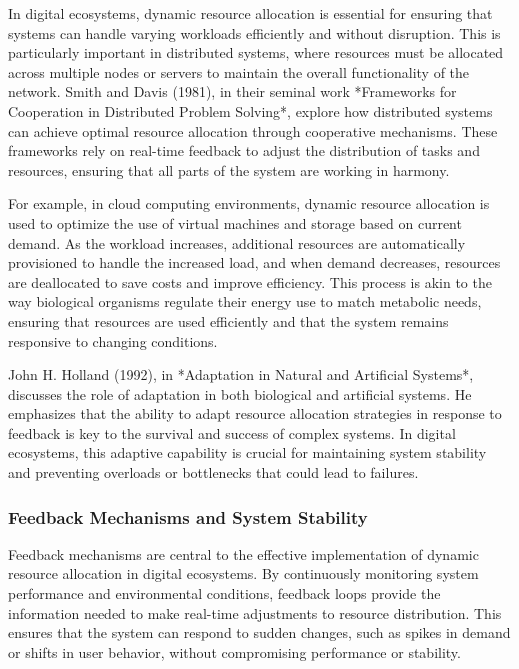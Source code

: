 \documentclass[12pt,twoside]{article}
\begin{document}
In digital ecosystems, dynamic resource allocation is essential for ensuring that systems can handle varying workloads efficiently and without disruption. This is particularly important in distributed systems, where resources must be allocated across multiple nodes or servers to maintain the overall functionality of the network. Smith and Davis (1981), in their seminal work *Frameworks for Cooperation in Distributed Problem Solving*, explore how distributed systems can achieve optimal resource allocation through cooperative mechanisms. These frameworks rely on real-time feedback to adjust the distribution of tasks and resources, ensuring that all parts of the system are working in harmony.

For example, in cloud computing environments, dynamic resource allocation is used to optimize the use of virtual machines and storage based on current demand. As the workload increases, additional resources are automatically provisioned to handle the increased load, and when demand decreases, resources are deallocated to save costs and improve efficiency. This process is akin to the way biological organisms regulate their energy use to match metabolic needs, ensuring that resources are used efficiently and that the system remains responsive to changing conditions.

John H. Holland (1992), in *Adaptation in Natural and Artificial Systems*, discusses the role of adaptation in both biological and artificial systems. He emphasizes that the ability to adapt resource allocation strategies in response to feedback is key to the survival and success of complex systems. In digital ecosystems, this adaptive capability is crucial for maintaining system stability and preventing overloads or bottlenecks that could lead to failures.

\subsubsection{Feedback Mechanisms and System Stability}

Feedback mechanisms are central to the effective implementation of dynamic resource allocation in digital ecosystems. By continuously monitoring system performance and environmental conditions, feedback loops provide the information needed to make real-time adjustments to resource distribution. This ensures that the system can respond to sudden changes, such as spikes in demand or shifts in user behavior, without compromising performance or stability.
\end{document}
